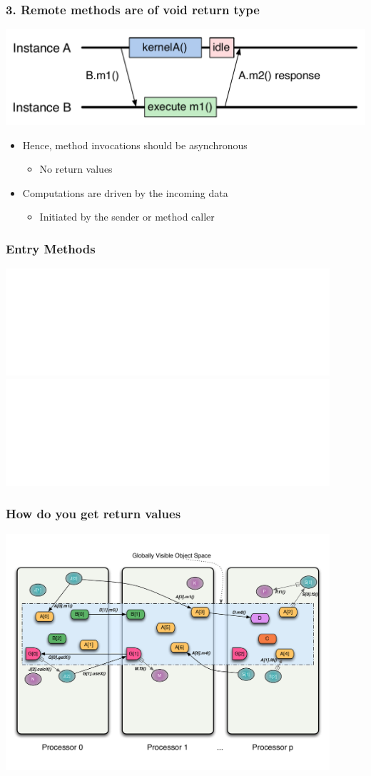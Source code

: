 \begin{frame}
\frametitle{3. Remote methods are of void return type}
  \begin{center}
    \includegraphics[width=\textwidth]{../figures/objectSequenceAsync.pdf}
  \end{center}
  \begin{itemize}
  \item Hence, method invocations should be asynchronous
    \begin{itemize}
    \item No return values
    \end{itemize}
  \item Computations are driven by the incoming data
    \begin{itemize}
    \item Initiated by the sender or method caller
    \end{itemize}
  \end{itemize}
\end{frame}


\begin{frame}
\frametitle{ {Entry Methods}}
	\begin{center}
        \includegraphics<1>[width=0.9\textwidth]{../figures/progmodel/11-global-methods.pdf}
        \includegraphics<2->[width=0.9\textwidth]{../figures/progmodel/12-async-nonblock-rmi.pdf}
	\end{center}
\end{frame}


\begin{frame}
\frametitle{How do you get return values}
	\begin{center}
        \includegraphics[width=0.9\textwidth]{../figures/progmodel/13-rmi-return-values.pdf}
	\end{center}
\end{frame}


